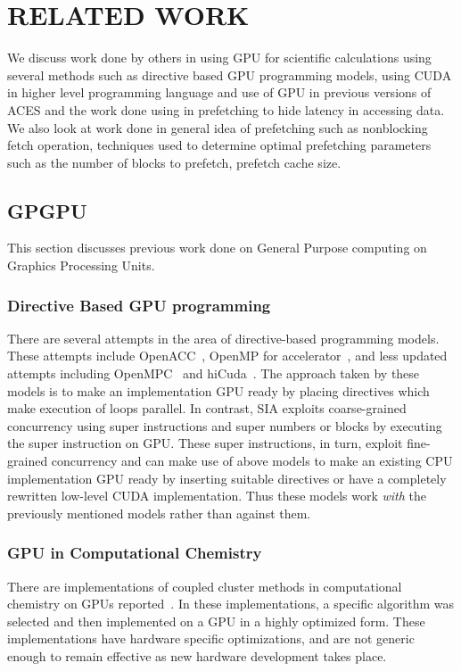 \chapter{RELATED WORK}\label{lit}

We discuss work done by others in using GPU for scientific calculations using
several methods such as directive based GPU programming models, using CUDA in
higher level programming language and use of GPU in previous versions of ACES
and the work done using in prefetching to hide latency in accessing data. We also look
at work done in general idea of prefetching such as nonblocking fetch operation,
techniques used to determine optimal prefetching parameters such as the number of
blocks to prefetch, prefetch cache size.

\section{GPGPU}
This section discusses previous work done on General Purpose computing on Graphics
Processing Units.

\subsection{Directive Based GPU programming}
There are several attempts in the area of directive-based programming models. These
attempts include OpenACC~\cite{openacc}, OpenMP for
accelerator~\cite{openmpforaccelerators}, and less updated attempts including
OpenMPC~\cite{openmpc} and hiCuda~\cite{hicuda}. The approach taken by these models
is to make an implementation GPU ready by placing directives which make
execution of loops parallel. In contrast, SIA exploits coarse-grained
concurrency using super instructions and super numbers or blocks by executing
the super instruction on GPU. These super instructions, in turn, exploit fine-grained
concurrency and can make use of above models to make an existing CPU implementation
GPU ready by inserting suitable directives or have a completely rewritten low-level
CUDA implementation. Thus these models work \textit{with} the previously mentioned
models rather than against them.

\subsection{GPU in Computational Chemistry}
There are implementations of coupled cluster methods in computational chemistry
on GPUs reported~\cite{bhaskar2013}\cite{deprince2011}\cite{maw2011}. In these
implementations, a specific algorithm was selected and then implemented on a
GPU in a highly optimized form. These implementations have hardware specific
optimizations, and are not generic enough to remain effective as new hardware
development takes place.

